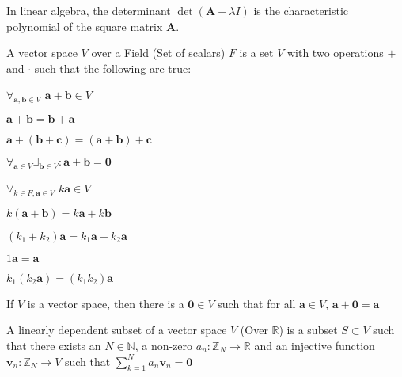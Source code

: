     In linear algebra, the determinant
    $\det(\mathbf{A}-\lambda{I})$ is the characteristic
    polynomial of the square matrix $\mathbf{A}$.
    \begin{definition}
        A vector space $V$ over a Field (Set of scalars)
        $F$ is a set $V$ with two operations
        $+$ and $\cdot$
        such that the following are true:
        \begin{enumerate}
            \begin{multicols}{3}
                \item $\forall_{{\mathbf{a},%
                                 \mathbf{b}}\in{V}}$
                      ${\mathbf{a}+\mathbf{b}}\in{V}$
                \item $\mathbf{a}+\mathbf{b}%
                       =\mathbf{b}+\mathbf{a}$
                \item $\mathbf{a}+(\mathbf{b}+\mathbf{c})%
                       =(\mathbf{a}+\mathbf{b})+\mathbf{c}$
                \item $\forall_{\mathbf{a}\in{V}}%
                       \exists_{\mathbf{b}\in{V}}:%
                       \mathbf{a}+\mathbf{b}=\mathbf{0}$
                \item $\forall_{{k}\in{F},\mathbf{a}\in{V}}$
                      $k\mathbf{a}\in{V}$
                \item $k(\mathbf{a}+\mathbf{b})%
                       =k\mathbf{a}+k\mathbf{b}$
                \item $(k_{1}+k_{2})\mathbf{a}%
                       =k_{1}\mathbf{a}+k_{2}\mathbf{a}$
                \item $1\mathbf{a}=\mathbf{a}$
                \item $k_{1}(k_{2}\mathbf{a})%
                       =(k_{1}k_{2})\mathbf{a}$
            \end{multicols}
        \end{enumerate}
    \end{definition}
    \begin{theorem}
        If $V$ is a vector space, then there is a
        $\mathbf{0}\in{V}$ such that for all
        $\mathbf{a}\in{V}$,
        $\mathbf{a}+\mathbf{0}=\mathbf{a}$
    \end{theorem}
    \begin{definition}
        A linearly dependent subset of a vector space
        $V$ (Over $\mathbb{R}$)
        is a subset ${S}\subset{V}$ such that
        there exists an $N\in\mathbb{N}$, a non-zero
        $a_{n}:\mathbb{Z}_{N}\rightarrow\mathbb{R}$
        and an injective function
        $\mathbf{v}_{n}:\mathbb{Z}_{N}\rightarrow{V}$
        such that
        $\sum_{k=1}^{N}a_{n}\mathbf{v}_{n}=\mathbf{0}$
    \end{definition}

